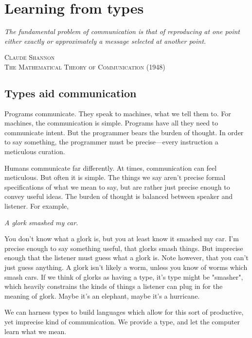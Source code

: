 \chapter{Learning from types}

\begin{singlespace}
\setlength{\epigraphwidth}{0.6\textwidth}
\epigraph{\textit{The fundamental problem of communication is that of reproducing at one point either exactly or approximately a message selected at another point.}}{\textsc{Claude Shannon \\  The Mathematical Theory of Communication (1948)}}
\end{singlespace}

\section{Types aid communication}
Programs communicate. They speak to machines, what we tell them to. For machines, the communication is simple. Programs have all they need to communicate intent. But the programmer bears the burden of thought. In order to say something, the programmer must be precise---every instruction a meticulous curation.

Humans communicate far differently. At times, communication can feel meticulous. But often it is simple. The things we say aren't precise formal specifications of what we mean to say, but are rather just precise enough to convey useful ideas. The burden of thought is balanced between speaker and listener. For example,
\begin{displayquote}
\centering
\textit{A glork smashed my car.}
\end{displayquote}
You don't know what a glork is, but you at least know it smashed my car. I'm precise enough to say something useful, that glorks smash things. But imprecise enough that the listener must guess what a glork is. Note however, that you can't just guess anything. A glork isn't likely a worm, unless you know of worms which smash cars. If we think of glorks as having a type, it's type might be "smasher", which heavily constrains the kinds of things a listener can plug in for the meaning of glork. Maybe it's an elephant, maybe it's a hurricane. 

We can harness types to build languages which allow for this sort of productive, yet imprecise kind of communication. We provide a type, and let the computer learn what we mean. 




